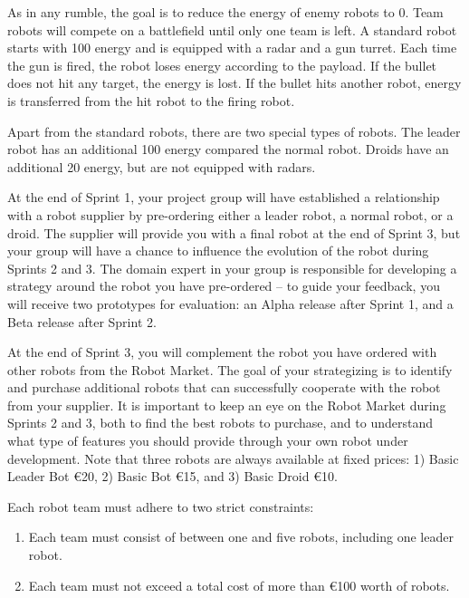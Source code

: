 \documentclass{scrreprt}
\begin{document}
As in any rumble, the goal is to reduce the energy of enemy robots to 0. Team robots will compete on a battlefield until only one team is left. A standard robot starts with 100 energy and is equipped with a radar and a gun turret. Each time the gun is fired, the robot loses energy according to the payload. If the bullet does not hit any target, the energy is lost. If the bullet hits another robot, energy is transferred from the hit robot to the firing robot.

Apart from the standard robots, there are two special types of robots. The leader robot has an additional 100 energy compared the normal robot. Droids have an additional 20 energy, but are not equipped with radars.

At the end of Sprint 1, your project group will have established a relationship with a robot supplier by pre-ordering either a leader robot, a normal robot, or a droid. The supplier will provide you with a final robot at the end of Sprint 3, but your group will have a chance to influence the evolution of the robot during Sprints 2 and 3. The domain expert in your group is responsible for developing a strategy around the robot you have pre-ordered -- to guide your feedback, you will receive two prototypes for evaluation: an Alpha release after Sprint 1, and a Beta release after Sprint 2.

At the end of Sprint 3, you will complement the robot you have ordered with other robots from the Robot Market. The goal of your strategizing is to identify and purchase additional robots that can successfully cooperate with the robot from your supplier. It is important to keep an eye on the Robot Market during Sprints 2 and 3, both to find the best robots to purchase, and to understand what type of features you should provide through your own robot under development. Note that three robots are always available at fixed prices: 1) Basic Leader Bot \euro20, 2) Basic Bot \euro15, and 3) Basic Droid \euro10.

Each robot team must adhere to two strict constraints: 

\begin{enumerate} %
\item Each team must consist of between one and five robots, including one leader robot.
\item Each team must not exceed a total cost of more than \euro 100 worth of robots.
\end{enumerate}
\end{document}
